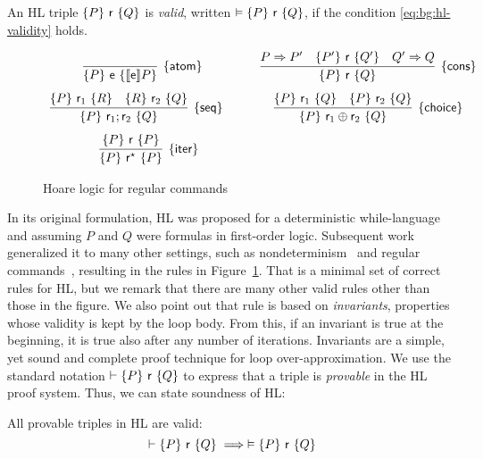\noindent
An HL triple $\{P\}~\mathsf{r}~\{Q\}$ is \emph{valid}, written $\vDash \{P\}~\mathsf{r}~\{Q\}$, if the condition \eqref{eq:bg:hl-validity} holds.

\begin{figure}[t]
	\centering
	\begin{framed}
			\(
			\begin{array}{cc}
				\infer[\hlrule{atom}]
				{\overtriple{P}{\expe}{\denot{\expe}P}}
				{}
				\quad &
				\infer[\hlrule{cons}]
				{\overtriple{P}{\regr}{Q}}
				{P \Rightarrow P' & \overtriple{P'}{\regr}{Q'}& Q' \Rightarrow Q}
				\\[7.5pt]
				\infer[\hlrule{seq}]
				{\overtriple{P}{\regr_1;\regr_2}{Q}}
				{\overtriple{P}{\regr_1}{R} &
					\overtriple{R}{\regr_2}{Q}}
				\qquad &
				\infer[\hlrule{choice}]
				{\overtriple{P}{\regr_1 \regplus \regr_2}{Q}}
				{\overtriple{P}{\regr_1}{Q} & \overtriple{P}{\regr_2}{Q}}
				\\[7.5pt]
				\infer[\hlrule{iter}]
				{\overtriple{P}{\regr^\kstar}{P}}
				{\overtriple{P}{\regr}{P}}
			\end{array}
			\)
	\end{framed}
	\vspace{-1ex}
	\caption{Hoare logic for regular commands}\label{fig:bg:hl}
\end{figure}
In its original formulation, HL was proposed for a deterministic while-language and assuming $P$ and $Q$ were formulas in first-order logic.
Subsequent work generalized it to many other settings, such as nondeterminism~\cite{Apt84} and regular commands~\cite{MOH21}, resulting in the rules in Figure~\ref{fig:bg:hl}.
That is a minimal set of correct rules for HL, but we remark that there are many other valid rules other than those in the figure. We also point out that rule  is based on \emph{invariants}, properties whose validity is kept by the loop body. From this, if an invariant is true at the beginning, it is true also after any number of iterations. Invariants are a simple, yet sound and complete proof technique for loop over-approximation.
We use the standard notation $\vdash \{P\}~\mathsf{r}~\{Q\}$ to express that a triple is \emph{provable} in the HL proof system.
Thus, we can state soundness of HL:

\begin{theorem}
	All provable triples in HL are valid:
	\[
	\vdash \{P\}~\mathsf{r}~\{Q\} \implies \vDash \{P\}~\mathsf{r}~\{Q\}
	\]
\end{theorem}

